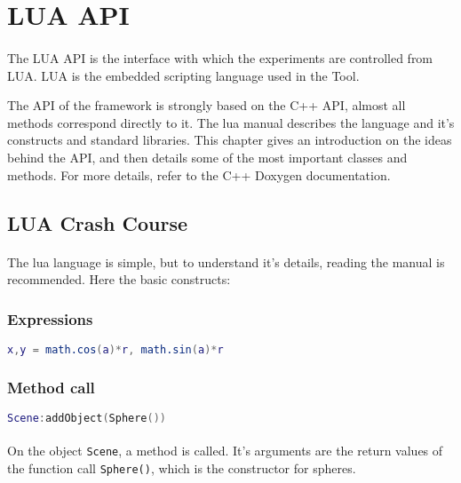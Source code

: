 \section{LUA API\label{LUAAPI}}
\paragraph{}
The LUA API is the interface with which the experiments are controlled from LUA.
LUA is the embedded scripting language used in the Tool.

The API of the framework is strongly based on the C++ API, almost all methods correspond directly to it.
The lua manual\cite{lua} describes the language and it's constructs and standard libraries.
This chapter gives an introduction on the ideas behind the API, and then details some of the most important classes and methods. For more details, refer to the C++ Doxygen documentation.


\subsection{LUA Crash Course}
\paragraph{}
The lua language is simple, but to understand it's details, reading the manual\cite{lua} is recommended.
Here the basic constructs:

\subsubsection{Expressions}

\begin{lstlisting}[language=lua]
x,y = math.cos(a)*r, math.sin(a)*r
\end{lstlisting}

\subsubsection{Method call}
\begin{lstlisting}[language=lua]
Scene:addObject(Sphere())
\end{lstlisting}

\paragraph{}
On the object  \texttt{Scene}, a method is called. It's arguments are the return values of the function call \texttt{Sphere()}, which is the constructor for spheres.

